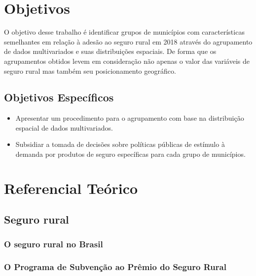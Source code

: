 \documentclass[12pt, a4paper,brazil,oneside]{article}
\begin{document}
	
	\newpage
	\section{Objetivos}\label{objetivos}
	
	O objetivo desse trabalho é identificar grupos de municípios com características semelhantes em relação à adesão ao seguro rural em 2018 através do agrupamento de dados multivariados e suas distribuições espaciais. De forma que os agrupamentos obtidos levem em consideração não apenas o valor das variáveis de seguro rural mas também seu posicionamento geográfico. 
	
	\subsection{Objetivos Específicos}
	
	\begin{itemize}
		\item Apresentar um procedimento para o agrupamento com base na distribuição espacial de dados multivariados.
		
		\item Subsidiar a tomada de decisões sobre políticas públicas de estímulo à demanda por produtos de seguro específicas para cada grupo de municípios.
	\end{itemize} 	
	
	\newpage
	\section{Referencial Teórico}\label{referencial}
	
	\subsection{Seguro rural}
		
	\subsubsection{O seguro rural no Brasil}
	
	\subsubsection{O Programa de Subvenção ao Prêmio do Seguro Rural}		
\end{document}
